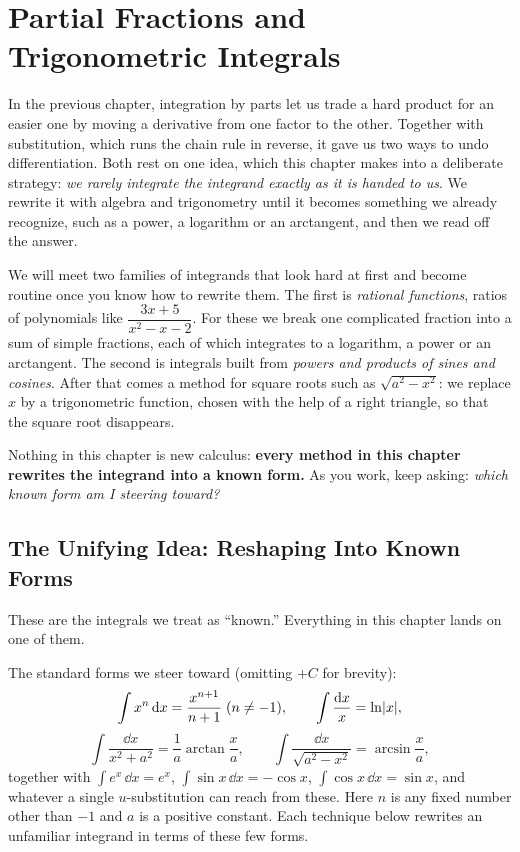 \chapter{Partial Fractions and Trigonometric Integrals}

In the previous chapter, integration by parts let us trade a hard product for
an easier one by moving a derivative from one factor to the other. Together
with substitution, which runs the chain rule in reverse, it gave us two ways to
undo differentiation. Both rest on one idea, which this chapter makes into a
deliberate strategy: \emph{we rarely integrate the integrand exactly as it is
handed to us}. We rewrite it with algebra and trigonometry until it becomes
something we already recognize, such as a power, a logarithm or an arctangent,
and then we read off the answer.

We will meet two families of integrands that look hard at first and become
routine once you know how to rewrite them. The first is \emph{rational
functions}, ratios of polynomials like $\dfrac{3x+5}{x^2-x-2}$. For these we
break one complicated fraction into a sum of simple fractions, each of which
integrates to a logarithm, a power or an arctangent. The second is integrals
built from \emph{powers and products of sines and cosines}. After that comes a
method for square roots such as $\sqrt{a^2 - x^2}$: we replace $x$ by a
trigonometric function, chosen with the help of a right triangle, so that the
square root disappears.

Nothing in this chapter is new calculus: \textbf{every method in this chapter
rewrites the integrand into a known form.} As you work, keep asking:
\emph{which known form am I steering toward?}

\chapterline

\section{The Unifying Idea: Reshaping Into Known Forms}
\label{ch24:reshape}

These are the integrals we treat as ``known.'' Everything in this chapter
lands on one of them.

\begin{focusbox}
The standard forms we steer toward (omitting $+C$ for brevity):
\[
\int x^n\,\mathrm{d} x = \frac{x^{n+1}}{n+1}\;(n\neq -1),
\qquad
\int \frac{\mathrm{d} x}{x} = \ln\lvert x\rvert,
\]
\[
\int \frac{\dd x}{x^2 + a^2} = \frac{1}{a}\arctan\!\frac{x}{a},
\qquad
\int \frac{\dd x}{\sqrt{a^2 - x^2}} = \arcsin\!\frac{x}{a},
\]
together with $\int e^x\,\dd x = e^x$, $\int \sin x\,\dd x = -\cos x$,
$\int \cos x\,\dd x = \sin x$, and whatever a single $u$-substitution can
reach from these. Here $n$ is any fixed number other than $-1$ and $a$ is a
positive constant. Each technique below rewrites an unfamiliar integrand in
terms of these few forms.
\end{focusbox}

